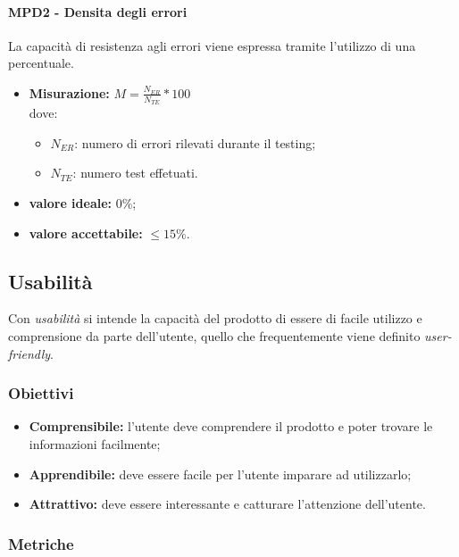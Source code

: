 \paragraph{MPD2 - Densita degli errori} La capacità di resistenza agli errori viene espressa tramite l'utilizzo di una percentuale.
\begin{itemize}
	\item \textbf{Misurazione:} \begin{math}M=\frac{N_{ER}}{N_{TE}}*100\end{math}\\
	dove:
	\begin {itemize}
		\item \begin{math}N_{ER}\end{math}: numero di errori rilevati durante il testing;
		\item \begin{math}N_{TE}\end{math}: numero test effetuati.
	\end{itemize}
	\item \textbf{valore ideale:} 0\%;
	\item \textbf{valore accettabile:}  \begin{math}\leq15\%\end{math}.
\end{itemize}

\subsection{Usabilità}
Con \textit{usabilità} si intende la capacità del prodotto di essere di facile utilizzo e comprensione da parte dell'utente, quello che frequentemente viene definito \textit{user-friendly}.
\subsubsection{Obiettivi}
\begin {itemize}
	\item \textbf{Comprensibile:} l'utente deve comprendere il prodotto e poter trovare le informazioni facilmente;
	\item \textbf{Apprendibile:} deve essere facile per l'utente imparare ad utilizzarlo;
	\item \textbf{Attrattivo:} deve essere interessante e catturare l'attenzione dell'utente.
\end{itemize}
\subsubsection{Metriche}
